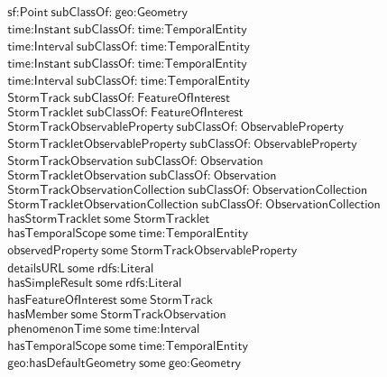 \begin{align}
  \textsf{sf:Point}~\textsf{subClassOf:}~\textsf{geo:Geometry}\\
  \textsf{time:Instant}~\textsf{subClassOf:}~\textsf{time:TemporalEntity}\\
  \textsf{time:Interval}~\textsf{subClassOf:}~\textsf{time:TemporalEntity}\\
  \textsf{time:Instant}~\textsf{subClassOf:}~\textsf{time:TemporalEntity}\\
  \textsf{time:Interval}~\textsf{subClassOf:}~\textsf{time:TemporalEntity}\\
  \textsf{StormTrack}~\textsf{subClassOf:}~\textsf{FeatureOfInterest}\\
  \textsf{StormTracklet}~\textsf{subClassOf:}~\textsf{FeatureOfInterest}\\
  \textsf{StormTrackObservableProperty}~\textsf{subClassOf:}~\textsf{ObservableProperty}\\
  \textsf{StormTrackletObservableProperty}~\textsf{subClassOf:}~\textsf{ObservableProperty}\\
  \textsf{StormTrackObservation}~\textsf{subClassOf:}~\textsf{Observation}\\
  \textsf{StormTrackletObservation}~\textsf{subClassOf:}~\textsf{Observation}\\
  \textsf{StormTrackObservationCollection}~\textsf{subClassOf:}~\textsf{ObservationCollection}\\
  \textsf{StormTrackletObservationCollection}~\textsf{subClassOf:}~\textsf{ObservationCollection}\\
  \textsf{hasStormTracklet}~\textsf{some}~\textsf{StormTracklet}\\
  \textsf{hasTemporalScope}~\textsf{some}~\textsf{time:TemporalEntity}\\
  \textsf{observedProperty}~\textsf{some}~\textsf{StormTrackObservableProperty}\\
  \textsf{detailsURL}~\textsf{some}~\textsf{rdfs:Literal}\\
  \textsf{hasSimpleResult}~\textsf{some}~\textsf{rdfs:Literal}\\
  \textsf{hasFeatureOfInterest}~\textsf{some}~\textsf{StormTrack}\\
  \textsf{hasMember}~\textsf{some}~\textsf{StormTrackObservation}\\
  \textsf{phenomenonTime}~\textsf{some}~\textsf{time:Interval}\\
  \textsf{hasTemporalScope}~\textsf{some}~\textsf{time:TemporalEntity}\\
  \textsf{geo:hasDefaultGeometry}~\textsf{some}~\textsf{geo:Geometry}\\

\end{align}
